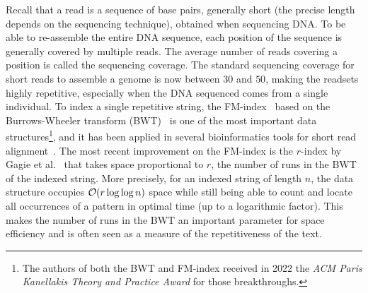 Recall that a read is a sequence of base pairs, generally short (the precise length depends on the sequencing technique), obtained when sequencing DNA. To be able to re-assemble the entire DNA sequence, each position of the sequence is generally covered by multiple reads. The average number of reads covering a position is called the sequencing coverage.
The standard sequencing coverage for short reads to assemble a genome is now between $30$ and $50$, making the readsets highly repetitive, especially when the DNA sequenced comes from a single individual.
To index a single repetitive string, the FM-index~\cite{ferragina2005indexing} based on the Burrows-Wheeler transform (BWT)~\cite{burrows1994block} is one of the most important data structures\footnote{The authors of both the BWT and FM-index received in 2022 the \textit{ACM Paris Kanellakis Theory and Practice Award} for those breakthroughs.}, and it has been applied in several bioinformatics tools for short read alignment~\cite{langmead2009ultrafast,langmead2012fast,li2009fast}.
The most recent improvement on the FM-index is the $r$-index by Gagie et al.~\cite{gagie2020fully} that takes space proportional to $r$, the number of runs in the BWT of the indexed string. More precisely, for an indexed string of length $n$, the data structure occupies $\mathcal{O}(r\log\log n)$ space while still being able to count and locate all occurrences of a pattern in optimal time (up to a logarithmic factor). This makes the number of runs in the BWT an important parameter for space efficiency and is often seen as a measure of the repetitiveness of the text.


